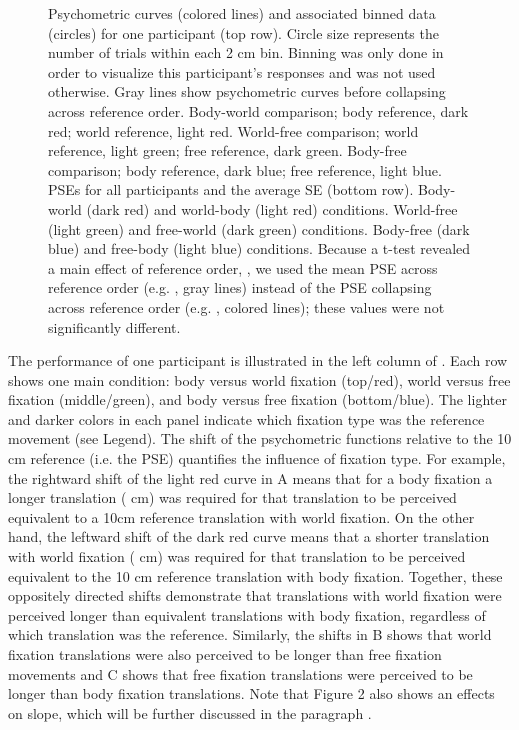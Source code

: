 \begin{figure}
    \caption{Psychometric curves (colored lines) and associated binned data (circles) for one participant (top row). Circle size represents the number of trials within each 2 \si{\centi\metre} bin. Binning was only done in order to visualize this participant's responses and was not used otherwise. Gray lines show psychometric curves before collapsing across reference order.  Body-world comparison; body reference, dark red; world reference, light red.  World-free comparison; world reference, light green; free reference, dark green.   Body-free comparison; body reference, dark blue; free reference, light blue. \newline
PSEs for all participants and the average {\textpm}SE (bottom row).  Body-world (dark red) and world-body (light red) conditions.  World-free (light green) and free-world (dark green) conditions.  Body-free (dark blue) and free-body (light blue) conditions. Because a t-test revealed a main effect of reference order, , we used the mean PSE across reference order (e.g. , gray lines) instead of the PSE collapsing across reference order (e.g. , colored lines); these values were not significantly different.}
    \label{p3:fig2}
\end{figure}

The performance of one participant is illustrated in the left column of . Each row shows one main condition: body versus world fixation (top/red), world versus free fixation (middle/green), and body versus free fixation (bottom/blue). The lighter and darker colors in each panel indicate which fixation type was the reference movement (see Legend). The shift of the psychometric functions relative to the 10 \si{\centi\metre} reference (i.e. the PSE) quantifies the influence of fixation type. For example, the rightward shift of the light red curve in A means that for a body fixation a longer translation ( \si{\centi\metre}) was required for that translation to be perceived equivalent to a 10\si{\centi\metre} reference translation with world fixation. On the other hand, the leftward shift of the dark red curve means that a shorter translation with world fixation ( \si{\centi\metre}) was required for that translation to be perceived equivalent to the 10 \si{\centi\metre} reference translation with body fixation. Together, these oppositely directed shifts demonstrate that translations with world fixation were perceived longer than equivalent translations with body fixation, regardless of which translation was the reference.  Similarly, the shifts in B shows that world fixation translations were also perceived to be longer than free fixation movements and C shows that free fixation translations were perceived to be longer than body fixation translations. Note that Figure 2 also shows an effects on slope, which will be further discussed in the paragraph .

